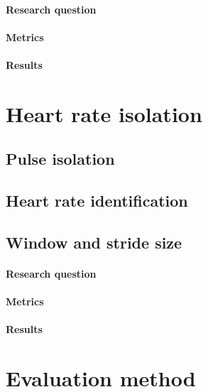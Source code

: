 \paragraph{Research question}
\paragraph{Metrics}
\paragraph{Results}

\section{Heart rate isolation}
\subsection{Pulse isolation}
\label{section:bss}
\label{section:ica_assumption}
\subsection{Heart rate identification}
\subsection{Window and stride size}
\paragraph{Research question}
\paragraph{Metrics}
\paragraph{Results}

\section{Evaluation method}

